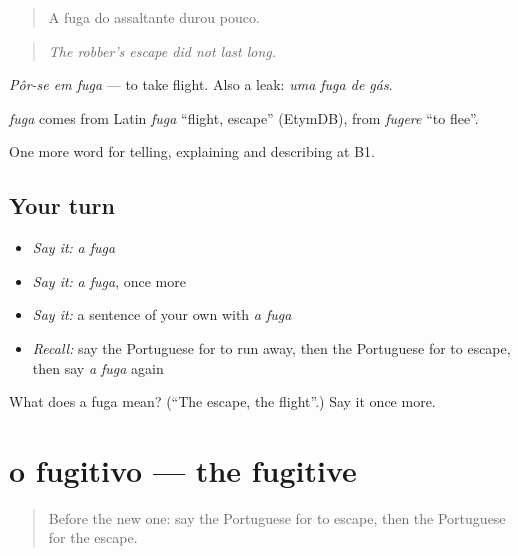 \begin{quote}
A fuga do assaltante durou pouco.
\end{quote}

\begin{quote}
\emph{The robber’s escape did not last long.}
\end{quote}

\emph{Pôr-se em fuga} — to take flight. Also a leak: \emph{uma fuga de gás}.

\begin{cousinweb}
\emph{fuga} comes from Latin \emph{fuga} \textquotedblleft{}flight, escape\textquotedblright{} (EtymDB), from \emph{fugere} \textquotedblleft{}to flee\textquotedblright{}.
\end{cousinweb}

\begin{grammarlens}[title={What you've built}]
One more word for telling, explaining and describing at B1.
\end{grammarlens}

\subsection*{Your turn}
\begin{itemize}
\raggedright
  \item \emph{Say it:} \emph{a fuga}
  \item \emph{Say it:} \emph{a fuga}, once more
  \item \emph{Say it:} a sentence of your own with \emph{a fuga}
  \item \emph{Recall:} say the Portuguese for to run away, then the Portuguese for to escape, then say \emph{a fuga} again
\end{itemize}

\begin{tcolorbox}[breakable,colback=teal!4,colframe=teal!35!black,title={Before you move on}]
What does a fuga mean? (\textquotedblleft{}The escape, the flight\textquotedblright{}.) Say it once more.
\end{tcolorbox}
\section[o fugitivo]{o fugitivo — the fugitive}

\label{lesson:PT-C292-fugitivo}



\begin{quote}
Before the new one: say the Portuguese for to escape, then the Portuguese for the escape.
\end{quote}

